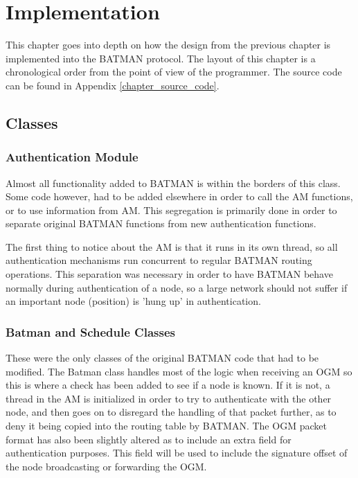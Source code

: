 \chapter{Implementation}
\label{ch:implementation}
\acresetall

This chapter goes into depth on how the design from the previous chapter is
implemented into the BATMAN protocol. The layout of this chapter is a
chronological order from the point of view of the programmer. The source code
can be found in Appendix \ref{chapter_source_code}.


\section{Classes}

\subsection{Authentication Module}
Almost all functionality added to BATMAN is within the borders of this class.
Some code however, had to be added elsewhere in order to call the \ac{AM}
functions, or to use information from \ac{AM}. This segregation is primarily
done in order to separate original BATMAN functions from new authentication
functions.

The first thing to notice about the \ac{AM} is that it runs in its own thread,
so all authentication mechanisms run concurrent to regular BATMAN routing
operations. This separation was necessary in order to have BATMAN behave
normally during authentication of a node, so a large network should not suffer
if an important node (position) is 'hung up' in authentication.

\subsection{Batman and Schedule Classes}
These were the only classes of the original BATMAN code that had to be modified.
The Batman class handles most of the logic when receiving an \ac{OGM} so this is
where a check has been added to see if a node is known. If it is not, a thread
in the \ac{AM} is initialized in order to try to authenticate with the other
node, and then goes on to disregard the handling of that packet further, as to
deny it being copied into the routing table by BATMAN. The \ac{OGM} packet
format has also been slightly altered as to include an extra field for
authentication purposes. This field will be used to include the signature offset
of the node broadcasting or forwarding the \ac{OGM}.

